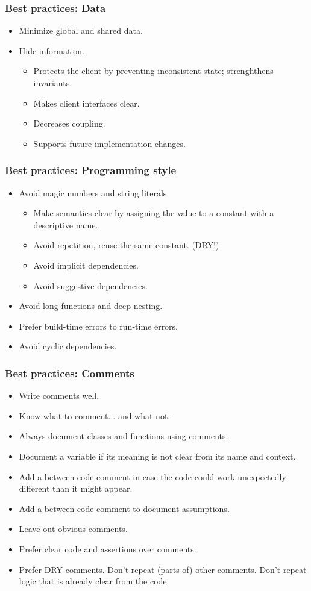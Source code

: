 
\begin{frame}
	\frametitle{Best practices: Data}
	\begin{itemize}[<+-| highlight@+>]
		\item Minimize global and shared data.
		\item Hide information.
		\begin{itemize}
			\item Protects the client by preventing inconsistent state; strenghthens invariants.
			\item Makes client interfaces clear.
			\item Decreases coupling.
			\item Supports future implementation changes.
		\end{itemize}
	\end{itemize}
\end{frame}


\begin{frame}
	\frametitle{Best practices: Programming style}
	\begin{itemize}[<+-| highlight@+>]
		\item Avoid magic numbers and string literals.
		\begin{itemize}
			\item Make semantics clear by assigning the value to a constant with a descriptive name.
			\item Avoid repetition, reuse the same constant. (DRY!)
			\item Avoid implicit dependencies.
			\item Avoid suggestive dependencies.
		\end{itemize}
		\item Avoid long functions and deep nesting.
		\item Prefer build-time errors to run-time errors.
		\item Avoid cyclic dependencies.
	\end{itemize}
\end{frame}


\begin{frame}
	\frametitle{Best practices: Comments}
	\begin{itemize}[<+-| highlight@+>]
		\item Write comments well.
		\item Know what to comment... and what not.
		\item Always document classes and functions using comments.
		\item Document a variable if its meaning is not clear from its name and context.
		\item Add a between-code comment in case the code could work unexpectedly different than it might appear.
		\item Add a between-code comment to document assumptions.
		\item Leave out obvious comments.
		\item Prefer clear code and assertions over comments.
		\item Prefer DRY comments. Don't repeat (parts of) other comments. Don't repeat logic that is already clear from the code.
	\end{itemize}
\end{frame}


